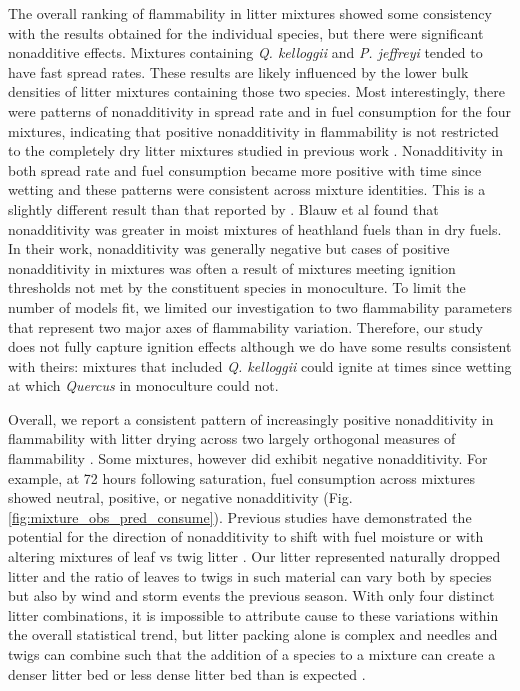 \documentclass[letterpaper,12pt]{article}
\begin{document}
The overall ranking of flammability in litter mixtures showed some consistency
with the results obtained for the individual species, but there were
significant nonadditive effects. Mixtures containing \emph{Q. kelloggii} and
\emph{P. jeffreyi} tended to have fast spread rates. These results are likely
influenced by the lower bulk densities of litter mixtures containing those two
species. Most interestingly, there were patterns of nonadditivity in spread
rate and in fuel consumption for the four mixtures, indicating that positive
nonadditivity in flammability is not restricted to the completely dry litter
mixtures studied in previous work \citep{Magalhaes+Schwilk-2012,
  VanAltena+Logtestjin+etal-2012}. Nonadditivity in both spread rate and fuel
consumption became more positive with time since wetting and these patterns
were consistent across mixture identities. This is a slightly different result
than that reported by \citet{Blauw+Wensink+etal-2015}. Blauw et
al found that nonadditivity was greater in moist mixtures of heathland fuels
than in dry fuels. In their work, nonadditivity was generally negative but
cases of positive nonadditivity in mixtures was often a result of mixtures
meeting ignition thresholds not met by the constituent species in monoculture.
To limit the number of models fit, we limited our investigation to two
flammability parameters that represent two major axes of flammability
variation. Therefore, our study does not fully capture ignition effects
although we do have some results consistent with theirs: mixtures that included
\emph{Q. kelloggii} could ignite at times since wetting at which \emph{Quercus}
in monoculture could not.

Overall, we report a consistent pattern of increasingly positive nonadditivity
in flammability with litter drying across two largely orthogonal measures of
flammability \citep{Schwilk-2015, Pausas+Keeley+etal-2017,
  Prior+Murphy+etal-2018}. Some mixtures, however did exhibit negative
nonadditivity. For example, at 72 hours following saturation, fuel consumption
across mixtures showed neutral, positive, or negative nonadditivity (Fig.
\ref{fig:mixture_obs_pred_consume}). Previous studies have demonstrated the
potential for the direction of nonadditivity to shift with fuel moisture
\citep{Blauw+Wensink+etal-2015} or with altering mixtures of leaf vs twig
litter \citep{Zhao+vanLogtestijn+etal-2019}. Our litter represented naturally
dropped litter and the ratio of leaves to twigs in such material can vary both
by species but also by wind and storm events the previous season. With only
four distinct litter combinations, it is impossible to attribute cause to these
variations within the overall statistical trend, but litter packing alone is
complex and needles and twigs can combine such that the addition of a species
to a mixture can create a denser litter bed or less dense litter bed than is
expected \citep{Zhao+vanLogtestijn+etal-2019}.
\end{document}
